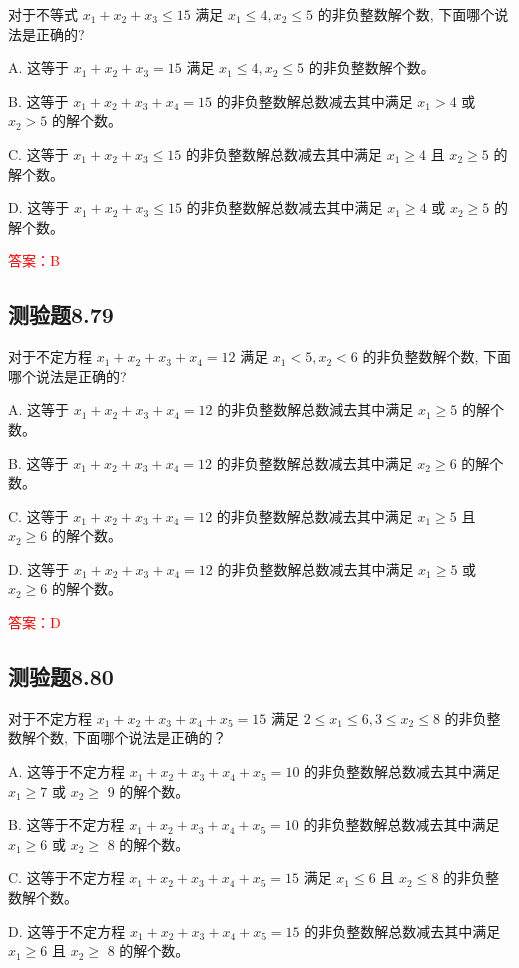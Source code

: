 \documentclass[UTF8, heading=true]{ctexart}
\begin{document}
对于不等式 $x_1+x_2+x_3 \leq 15$ 满足 $x_1 \leq 4, x_2 \leq 5$ 的非负整数解个数, 下面哪个说法是正确的?

A. 这等于 $x_1+x_2+x_3=15$ 满足 $x_1 \leq 4, x_2 \leq 5$ 的非负整数解个数。

B. 这等于 $x_1+x_2+x_3+x_4=15$ 的非负整数解总数减去其中满足 $x_1>4$ 或 $x_2>5$ 的解个数。

C. 这等于 $x_1+x_2+x_3 \leq 15$ 的非负整数解总数减去其中满足 $x_1 \geq 4$ 且 $x_2 \geq 5$ 的解个数。

D. 这等于 $x_1+x_2+x_3 \leq 15$ 的非负整数解总数减去其中满足 $x_1 \geq 4$ 或 $x_2 \geq 5$ 的解个数。

\textcolor{red}{答案：B}

\subsection{测验题8.79}

对于不定方程 $x_1+x_2+x_3+x_4=12$ 满足 $x_1<5, x_2<6$ 的非负整数解个数, 下面哪个说法是正确的?

A. 这等于 $x_1+x_2+x_3+x_4=12$ 的非负整数解总数減去其中满足 $x_1 \geq 5$ 的解个数。

B. 这等于 $x_1+x_2+x_3+x_4=12$ 的非负整数解总数减去其中满足 $x_2 \geq 6$ 的解个数。

C. 这等于 $x_1+x_2+x_3+x_4=12$ 的非负整数解总数减去其中满足 $x_1 \geq 5$ 且 $x_2 \geq 6$ 的解个数。

D. 这等于 $x_1+x_2+x_3+x_4=12$ 的非负整数解总数减去其中满足 $x_1 \geq 5$ 或 $x_2 \geq 6$ 的解个数。

\textcolor{red}{答案：D}

\subsection{测验题8.80}

对于不定方程 $x_1+x_2+x_3+x_4+x_5=15$ 满足 $2 \leq x_1 \leq 6,3 \leq x_2 \leq 8$ 的非负整数解个数, 下面哪个说法是正确的？

A. 
这等于不定方程 $x_1+x_2+x_3+x_4+x_5=10$ 的非负整数解总数减去其中满足 $x_1 \geq 7$ 或 $x_2 \geq$ 9 的解个数。

B. 
这等于不定方程 $x_1+x_2+x_3+x_4+x_5=10$ 的非负整数解总数减去其中满足 $x_1 \geq 6$ 或 $x_2 \geq$ 8 的解个数。

C. 这等于不定方程 $x_1+x_2+x_3+x_4+x_5=15$ 满足 $x_1 \leq 6$ 且 $x_2 \leq 8$ 的非负整数解个数。

D. 这等于不定方程 $x_1+x_2+x_3+x_4+x_5=15$ 的非负整数解总数减去其中满足 $x_1 \geq 6$ 且 $x_2 \geq$ 8 的解个数。
\end{document}
